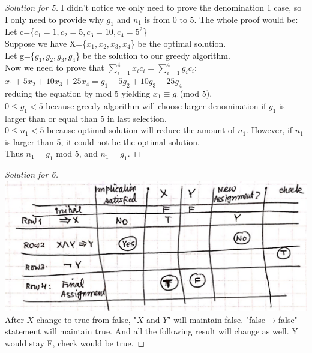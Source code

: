 \documentclass[12pt]{article}
\begin{document}
\begin{proof}[Solution for 5]
	I didn't notice we only need to prove the denomination 1 case, so I only need to provide why $g_1$ and $n_1$ is from 0 to 5. The whole proof would be:\\
	Let c=\{$c_1=1,c_2=5,c_3=10,c_4=5^2$\}\\
	Suppose we have X=\{$x_1,x_2,x_3,x_4$\} be the optimal solution.\\
	Let g=\{$g_1,g_2,g_3,g_4$\} be the solution to our greedy algorithm.\\
	Now we need to prove that $\sum_{i=1}^{4}x_ic_i=\sum_{i=1}^{4}g_ic_i$:\\
	$x_1+5x_2+10x_3+25x_4 = g_1+5g_2+10g_3+25g_4$\\
	reduing the equation by mod 5 yielding $x_1\equiv g_1$(mod 5).\\
	$0\le g_1 <5$ because greedy algorithm will choose larger denomination if $g_1$ is larger than or equal than 5 in last selection.\\
	$0\le n_1 <5$ because optimal solution will reduce the amount of $n_1$. However, if $n_1$ is larger than 5, it could not be the optimal solution.\\
	Thus $n_1=g_1$ mod 5, and $n_1=g_1$.
\end{proof}
\begin{proof}[Solution for 6]
	\includegraphics[scale=0.25]{6.png}\\
	After $X$ change to true from false, "$X$ and $Y$" will maintain false. "false$\rightarrow$false" statement will maintain true. And all the following result will change as well. Y would stay F, check would be true.
\end{proof}
\bigskip
\end{document}
